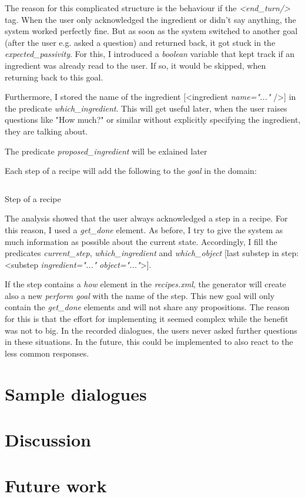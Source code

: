 \documentclass[
	11pt, %
]{fphw}
\newenvironment{code}
    {\captionsetup{
        type=listing,
        skip=2pt,
        belowskip=15pt
        }}
    {}
\begin{document}
The reason for this complicated structure is the behaviour if the \emph{<end\_turn/>} tag. When the user only acknowledged the ingredient or didn't say anything, the system worked perfectly fine. But as soon as the system switched to another goal (after the user e.g. asked a question) and returned back, it got stuck in the \emph{expected\_passivity}. For this, I introduced a \emph{boolean} variable that kept track if an ingredient was already read to the user. If so, it would be skipped, when returning back to this goal.

Furthermore, I stored the name of the ingredient [<ingredient \emph{name="..."} />] in the predicate \emph{which\_ingredient}. This will get useful later, when the user raises questions like "How much?" or similar without explicitly specifying the ingredient, they are talking about.

The predicate \emph{proposed\_ingredient} will be exlained later 

Each step of a recipe will add the following to the \emph{goal} in the domain:

\begin{code}
    \inputminted{xml}{includes/recipe_step.xml}
    \caption{Step of a recipe}
\end{code}

The analysis showed that the user always acknowledged a step in a recipe. For this reason, I used a \emph{get\_done} element. As before, I try to give the system as much information as possible about the current state. Accordingly, I fill the predicates \emph{current\_step}, \emph{which\_ingredient} and \emph{which\_object} [last substep in step: <substep \emph{ingredient="..."} \emph{object="..."}>].

If the step contains a \emph{how} element in the \emph{recipes.xml}, the generator will create also a new \emph{perform goal} with the name of the step. This new goal will only contain the \emph{get\_done} elements and will not share any propositions. The reason for this is that the effort for implementing it seemed complex while the benefit was not to big. In the recorded dialogues, the users never asked further questions in these situations. In the future, this could be implemented to also react to the less common responses.



\section*{Sample dialogues}

\section*{Discussion}

\section*{Future work}
\end{document}
